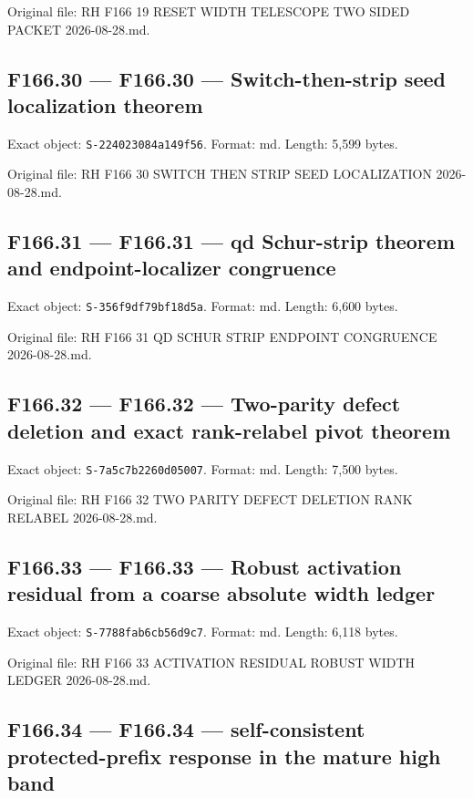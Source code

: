 \documentclass[
  10pt,
  a4paper,
  10pt,
  oneside,
  openany]{book}
\begin{document}
Original file: RH F166 19 RESET WIDTH TELESCOPE TWO SIDED PACKET
2026-08-28.md.

\subsection{F166.30 --- F166.30 --- Switch-then-strip seed localization
theorem}\label{source-f166-30}

Exact object: \texttt{S-224023084a149f56}. Format: md. Length: 5,599
bytes.

Original file: RH F166 30 SWITCH THEN STRIP SEED LOCALIZATION
2026-08-28.md.

\subsection{F166.31 --- F166.31 --- qd Schur-strip theorem and
endpoint-localizer congruence}\label{source-f166-31}

Exact object: \texttt{S-356f9df79bf18d5a}. Format: md. Length: 6,600
bytes.

Original file: RH F166 31 QD SCHUR STRIP ENDPOINT CONGRUENCE
2026-08-28.md.

\subsection{F166.32 --- F166.32 --- Two-parity defect deletion and exact
rank-relabel pivot theorem}\label{source-f166-32}

Exact object: \texttt{S-7a5c7b2260d05007}. Format: md. Length: 7,500
bytes.

Original file: RH F166 32 TWO PARITY DEFECT DELETION RANK RELABEL
2026-08-28.md.

\subsection{F166.33 --- F166.33 --- Robust activation residual from a
coarse absolute width ledger}\label{source-f166-33}

Exact object: \texttt{S-7788fab6cb56d9c7}. Format: md. Length: 6,118
bytes.

Original file: RH F166 33 ACTIVATION RESIDUAL ROBUST WIDTH LEDGER
2026-08-28.md.

\subsection{F166.34 --- F166.34 --- self-consistent protected-prefix
response in the mature high band}\label{source-f166-34}
\end{document}
